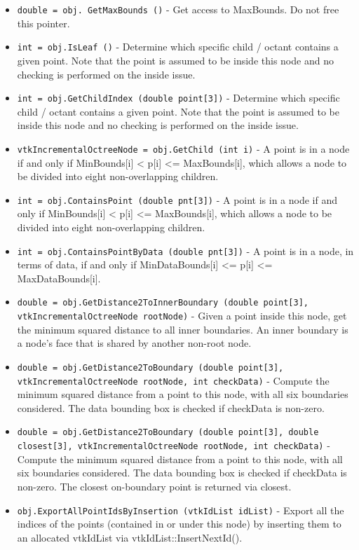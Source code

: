 \begin{itemize}
\item  \verb|double = obj. GetMaxBounds ()| -  Get access to MaxBounds. Do not free this pointer.

\item  \verb|int = obj.IsLeaf ()| -  Determine which specific child / octant contains a given point. Note that
 the point is assumed to be inside this node and no checking is performed 
 on the inside issue.

\item  \verb|int = obj.GetChildIndex (double point[3])| -  Determine which specific child / octant contains a given point. Note that
 the point is assumed to be inside this node and no checking is performed 
 on the inside issue.

\item  \verb|vtkIncrementalOctreeNode = obj.GetChild (int i)| -  A point is in a node if and only if MinBounds[i] < p[i] <= MaxBounds[i],
 which allows a node to be divided into eight non-overlapping children.

\item  \verb|int = obj.ContainsPoint (double pnt[3])| -  A point is in a node if and only if MinBounds[i] < p[i] <= MaxBounds[i],
 which allows a node to be divided into eight non-overlapping children.

\item  \verb|int = obj.ContainsPointByData (double pnt[3])| -  A point is in a node, in terms of data, if and only if MinDataBounds[i]
 <= p[i] <= MaxDataBounds[i].

\item  \verb|double = obj.GetDistance2ToInnerBoundary (double point[3], vtkIncrementalOctreeNode rootNode)| -  Given a point inside this node, get the minimum squared distance to all 
 inner boundaries. An inner boundary is a node's face that is shared by
 another non-root node. 

\item  \verb|double = obj.GetDistance2ToBoundary (double point[3], vtkIncrementalOctreeNode rootNode, int checkData)| -  Compute the minimum squared distance from a point to this node, with all
 six boundaries considered. The data bounding box is checked if checkData
 is non-zero. 

\item  \verb|double = obj.GetDistance2ToBoundary (double point[3], double closest[3], vtkIncrementalOctreeNode rootNode, int checkData)| -  Compute the minimum squared distance from a point to this node, with all
 six boundaries considered. The data bounding box is checked if checkData
 is non-zero. The closest on-boundary point is returned via closest.

\item  \verb|obj.ExportAllPointIdsByInsertion (vtkIdList idList)| -  Export all the indices of the points (contained in or under this node) by
 inserting them to an allocated vtkIdList via vtkIdList::InsertNextId().

\end{itemize}
